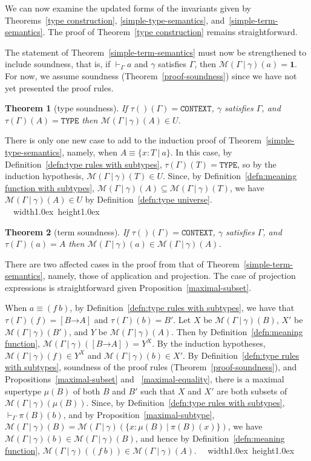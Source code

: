 \documentclass [12pt,twoside]{cslreport}
\newcommand{\thmbox}
   {{\ \hfill\hbox{%
      \vrule width1.0ex height1.0ex
   }\parfillskip 0pt }}
\newenvironment{proof}{{\bf Proof. }}{\thmbox}
\newcommand{\aro}{\mathord\rightarrow} %
\newcommand{\funtype}[2]{[#1 \aro #2]}
\newcommand{\tauGamma}[1]{\tau(\Gamma)(#1)}
\newcommand{\Mgamma}[1]{{\mathcal M}(\Gamma\vbar\gamma)(#1)}
\newcommand{\oneb}{\mathbf{1}}
\newcommand{\tttype}{\mathtt{TYPE}}
\newcommand{\ttcontext}{\mathtt{CONTEXT}}
\newcommand{\vbar}{\ |\ }
\newtheorem{theorem}{Theorem}
\begin{document}
We can now examine the updated forms of the invariants given by
Theorems~\ref{type construction},
\ref{simple-type-semantics},
and~\ref{simple-term-semantics}\@.  
The proof of Theorem~\ref{type construction} remains straightforward.
\begin{comment}
Theorems~\ref{simple-type-semantics}
and~\ref{simple-term-semantics} must be proved with a simultaneous
induction since types now contain terms.
\end{comment}
The statement of
Theorem~\ref{simple-term-semantics} must now
be strengthened to include soundness, that is, if $\vdash_\Gamma a$
and $\gamma$ satisfies $\Gamma$, then 
$\Mgamma{a} = \oneb$\@.  For now, we assume soundness
(Theorem~\ref{proof-soundness})  since we
have not yet presented the proof rules.  
%
\begin{theorem}[type soundness]
\label{subtype-type-semantics}
If $\tau()(\Gamma) = \ttcontext$, $\gamma$ satisfies $\Gamma$, and
$\tauGamma{A} = \tttype$ then $\Mgamma{A}\in U$.
\end{theorem}
\begin{proof}
There is only one new case to add to the induction proof of
Theorem~\ref{simple-type-semantics}, namely, when 
 $A\equiv \{x : T \vbar a\}$.   In this case, by
Definition~\ref{defn:type rules with subtypes},
$\tauGamma{T} = \tttype$, so by the induction hypothesis,
$\Mgamma{T} \in U$.  Since, by
Definition~\ref{defn:meaning function with subtypes}, $\Mgamma{A} \subseteq
\Mgamma{T}$, we have $\Mgamma{A}\in U$ by
Definition~\ref{defn:type universe}\@.
\end{proof}
\begin{theorem}[term soundness]\label{subtype-term-semantics}
If $\tau()(\Gamma) = \ttcontext$, $\gamma$ satisfies $\Gamma$, and $\tauGamma{a} = A$ then $\Mgamma{a} \in
\Mgamma{A}$\@.  
\end{theorem}
\begin{proof}  There are two affected cases in the proof from that of
Theorem~\ref{simple-term-semantics}, namely, those of application
and projection.  The case of projection expressions is straightforward
given Proposition~\ref{maximal-subset}.

When 
 $a \equiv (f\ b)$, by Definition~\ref{defn:type rules with subtypes},
we have that $\tauGamma{f} = \funtype{B}{A}$ and $\tauGamma{b} = B'$.
Let $X$ be $\Mgamma{B}$, $X'$ be $\Mgamma{B'}$,  and $Y$ be $\Mgamma{A}$.
Then by Definition~\ref{defn:meaning function}, $\Mgamma{\funtype{B}{A}} =
Y^X$\@.  By the induction hypotheses, $\Mgamma{f}\in Y^X$ and
$\Mgamma{b}\in X'$\@.  
By Definition~\ref{defn:type rules with subtypes},
soundness of the proof rules (Theorem~\ref{proof-soundness}), and
Propositions~\ref{maximal-subset} and 
~\ref{maximal-equality}, there is a 
maximal supertype $\mu(B)$ of both $B$ and $B'$ such that $X$ and $X'$
are both subsets of $\Mgamma{\mu(B)}$\@.  Since, by
Definition~\ref{defn:type rules with subtypes}, $\vdash_\Gamma{}\pi(B)(b)$,
and by Proposition~\ref{maximal-subtype}, $\Mgamma{B} =
\Mgamma{\{x : \mu(B)\vbar \pi(B)(x)\}}$, we have $\Mgamma{b}\in
\Mgamma{B}$, and hence by Definition~\ref{defn:meaning function}, $\Mgamma{(f\
b)}\in  \Mgamma{A}$\@.  
\end{proof}
\end{document}
